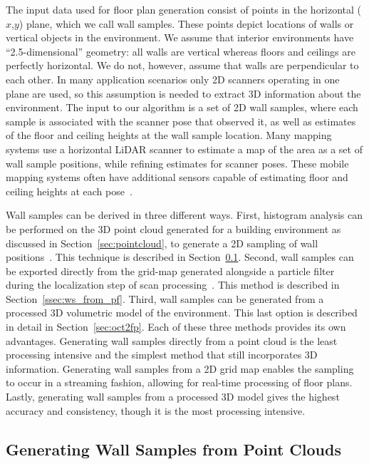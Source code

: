 \documentclass[12pt,onecolumn,oneside]{book}
\begin{document}
The input data used for floor plan generation consist of points in the horizontal ($x$,$y$) plane, which we call wall samples.  These points depict locations of walls or vertical objects in the environment.  We assume that interior environments have ``2.5-dimensional'' geometry:  all walls are vertical whereas floors and ceilings are perfectly horizontal.  We do not, however, assume that walls are perpendicular to each other.  In many application scenarios only 2D scanners operating in one plane are used, so this assumption is needed to extract 3D information about the environment.  The input to our algorithm is a set of 2D wall samples, where each sample is associated with the scanner pose that observed it, as well as estimates of the floor and ceiling heights at the wall sample location.  Many mapping systems use a horizontal LiDAR scanner to estimate a map of the area as a set of wall sample positions, while refining estimates for scanner poses.  These mobile mapping systems often have additional sensors capable of estimating floor and ceiling heights at each pose~\cite{Backpack,Quadrotor}.  

Wall samples can be derived in three different ways.  First, histogram analysis can be performed on the 3D point cloud generated for a building environment as discussed in Section~\ref{sec:pointcloud}, to generate a 2D sampling of wall positions~\cite{Turner12}.  This technique is described in Section~\ref{ssec:ws_from_pc}.  Second, wall samples can be exported directly from the grid-map generated alongside a particle filter during the localization step of scan processing~\cite{NickJournal,Turner14}.  This method is described in Section~\ref{ssec:ws_from_pf}.  Third, wall samples can be generated from a processed 3D volumetric model of the environment.  This last option is described in detail in Section~\ref{sec:oct2fp}.  Each of these three methods provides its own advantages.  Generating wall samples directly from a point cloud is the least processing intensive and the simplest method that still incorporates 3D information.  Generating wall samples from a 2D grid map enables the sampling to occur in a streaming fashion, allowing for real-time processing of floor plans.  Lastly, generating wall samples from a processed 3D model gives the highest accuracy and consistency, though it is the most processing intensive.

\subsection{Generating Wall Samples from Point Clouds}
\label{ssec:ws_from_pc}
\end{document}
